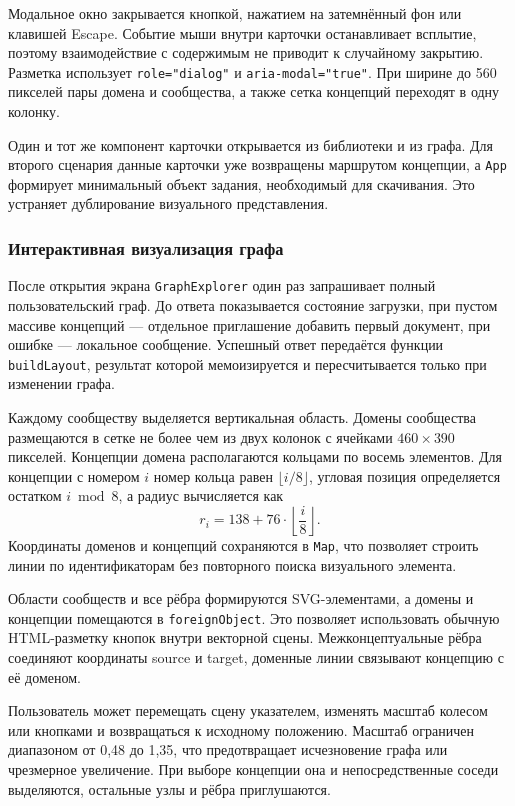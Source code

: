 Модальное окно закрывается кнопкой, нажатием на затемнённый фон или клавишей Escape. Событие мыши внутри карточки останавливает всплытие, поэтому взаимодействие с содержимым не приводит к случайному закрытию. Разметка использует \texttt{role="dialog"} и \texttt{aria-modal="true"}. При ширине до 560 пикселей пары домена и сообщества, а также сетка концепций переходят в одну колонку.

Один и тот же компонент карточки открывается из библиотеки и из графа. Для второго сценария данные карточки уже возвращены маршрутом концепции, а \texttt{App} формирует минимальный объект задания, необходимый для скачивания. Это устраняет дублирование визуального представления.

\subsubsection{Интерактивная визуализация графа}

После открытия экрана \texttt{GraphExplorer} один раз запрашивает полный пользовательский граф. До ответа показывается состояние загрузки, при пустом массиве концепций --- отдельное приглашение добавить первый документ, при ошибке --- локальное сообщение. Успешный ответ передаётся функции \texttt{buildLayout}, результат которой мемоизируется и пересчитывается только при изменении графа.

Каждому сообществу выделяется вертикальная область. Домены сообщества размещаются в сетке не более чем из двух колонок с ячейками $460 \times 390$ пикселей. Концепции домена располагаются кольцами по восемь элементов. Для концепции с номером $i$ номер кольца равен $\lfloor i/8 \rfloor$, угловая позиция определяется остатком $i \bmod 8$, а радиус вычисляется как
\begin{equation}
r_i = 138 + 76 \cdot \left\lfloor \frac{i}{8} \right\rfloor.
\end{equation}
Координаты доменов и концепций сохраняются в \texttt{Map}, что позволяет строить линии по идентификаторам без повторного поиска визуального элемента.

Области сообществ и все рёбра формируются SVG-элементами, а домены и концепции помещаются в \texttt{foreignObject}. Это позволяет использовать обычную HTML-разметку кнопок внутри векторной сцены. Межконцептуальные рёбра соединяют координаты source и target, доменные линии связывают концепцию с её доменом.

Пользователь может перемещать сцену указателем, изменять масштаб колесом или кнопками и возвращаться к исходному положению. Масштаб ограничен диапазоном от 0,48 до 1,35, что предотвращает исчезновение графа или чрезмерное увеличение. При выборе концепции она и непосредственные соседи выделяются, остальные узлы и рёбра приглушаются.

